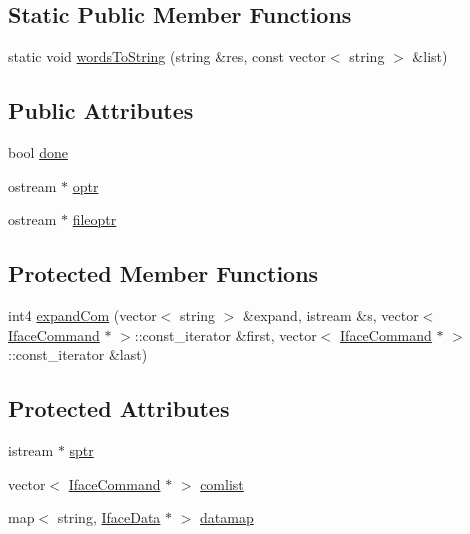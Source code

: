\subsection*{Static Public Member Functions}
\begin{DoxyCompactItemize}
\item 
static void \mbox{\hyperlink{class_iface_status_aacefbcd5c2cf3fddd11051682b614854}{words\+To\+String}} (string \&res, const vector$<$ string $>$ \&list)
\end{DoxyCompactItemize}
\subsection*{Public Attributes}
\begin{DoxyCompactItemize}
\item 
bool \mbox{\hyperlink{class_iface_status_aa8a31d6b1164019ee725b33e52769254}{done}}
\item 
ostream $\ast$ \mbox{\hyperlink{class_iface_status_a10ef65be4b8810a0445aa3ddf113e5b4}{optr}}
\item 
ostream $\ast$ \mbox{\hyperlink{class_iface_status_ac17129c5b310027bbdf5cea44c0de3d6}{fileoptr}}
\end{DoxyCompactItemize}
\subsection*{Protected Member Functions}
\begin{DoxyCompactItemize}
\item 
int4 \mbox{\hyperlink{class_iface_status_adb7a0b05e7487a3f75dcb3de2a447b45}{expand\+Com}} (vector$<$ string $>$ \&expand, istream \&s, vector$<$ \mbox{\hyperlink{class_iface_command}{Iface\+Command}} $\ast$ $>$\+::const\+\_\+iterator \&first, vector$<$ \mbox{\hyperlink{class_iface_command}{Iface\+Command}} $\ast$ $>$\+::const\+\_\+iterator \&last)
\end{DoxyCompactItemize}
\subsection*{Protected Attributes}
\begin{DoxyCompactItemize}
\item 
istream $\ast$ \mbox{\hyperlink{class_iface_status_a0f9b2e74d61ba5b4658bc1ee994fbe62}{sptr}}
\item 
vector$<$ \mbox{\hyperlink{class_iface_command}{Iface\+Command}} $\ast$ $>$ \mbox{\hyperlink{class_iface_status_a6bbe06c5f2004969442bd49b5cad7b14}{comlist}}
\item 
map$<$ string, \mbox{\hyperlink{class_iface_data}{Iface\+Data}} $\ast$ $>$ \mbox{\hyperlink{class_iface_status_ac85d5fe1254b348a3f77a9d5ec6603b8}{datamap}}
\end{DoxyCompactItemize}


